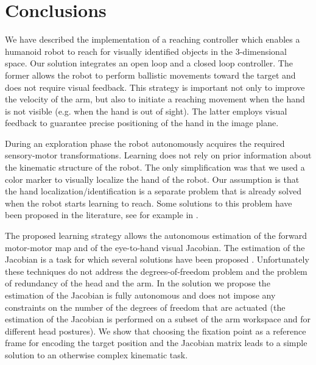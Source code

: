 \section{Conclusions}
We have described the implementation of a reaching controller which 
enables a humanoid robot to reach for visually identified objects 
in the 3-dimensional space. Our solution integrates an open loop and 
a closed loop controller. The former allows the robot to perform 
ballistic movements toward the target and does not require visual feedback.
This strategy is important not only to improve the velocity of the arm, but 
also to initiate a reaching movement when the hand is not visible (e.g. 
when the hand is out of sight). The latter employs visual feedback to guarantee precise positioning of the hand in the image plane.

During an exploration phase the robot autonomously acquires the required 
sensory-motor transformations. Learning does not rely on prior information 
about the kinematic structure of the robot. The only simplification was 
that we used a color marker to visually localize the hand of the robot. 
Our assumption is that the hand localization/identification is a separate 
problem that is already solved when the robot starts learning to reach. 
Some solutions to this problem have been proposed in the literature, 
see for example in \cite{Natale05,edsinger06what}.

The proposed learning strategy allows the autonomous estimation of the 
forward motor-motor map and of the eye-to-hand visual 
Jacobian. The estimation of the Jacobian is a task for which 
several solutions have been proposed 
\cite{Hosoda94versatile,Mansard06jacobian,Lapreste04efficient,scaz07fast}.
Unfortunately these techniques do not address the degrees-of-freedom problem 
and the problem of redundancy of the head and the arm. In the solution we
propose the estimation of the Jacobian is fully autonomous and 
does not impose any constraints on the number of the degrees of freedom
that are actuated (the estimation of the Jacobian is performed on a subset 
of the arm workspace and for different head postures). We show that 
choosing the fixation point as a reference frame for encoding the target 
position and the Jacobian matrix leads to a simple solution to an otherwise 
complex kinematic task.

